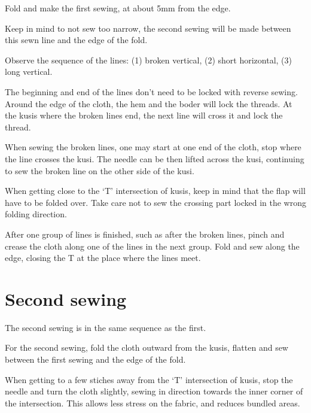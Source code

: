 Fold and make the first sewing, at about 5mm from the edge.

Keep in mind to not sew too narrow, the second sewing will be made
between this sewn line and the edge of the fold.



Observe the sequence of the lines: (1) broken vertical, (2) short
horizontal, (3) long vertical.

The beginning and end of the lines don't need to be locked with reverse
sewing. Around the edge of the cloth, the hem and the boder will lock
the threads. At the kusis where the broken lines end, the next line will
cross it and lock the thread.

When sewing the broken lines, one may start at one end of the cloth,
stop where the line crosses the kusi. The needle can be then lifted
across the kusi, continuing to sew the broken line on the other side of
the kusi.

When getting close to the `T' intersection of kusis, keep in mind that
the flap will have to be folded over. Take care not to sew the crossing
part locked in the wrong folding direction.

After one group of lines is finished, such as after the broken lines,
pinch and crease the cloth along one of the lines in the next group.
Fold and sew along the edge, closing the T at the place where the lines
meet.

\section{Second sewing}

The second sewing is in the same sequence as the first.

For the second sewing, fold the cloth outward from the kusis, flatten
and sew between the first sewing and the edge of the fold.

When getting to a few stiches away from the `T' intersection of kusis,
stop the needle and turn the cloth slightly, sewing in direction towards
the inner corner of the intersection. This allows less stress on the
fabric, and reduces bundled areas.



